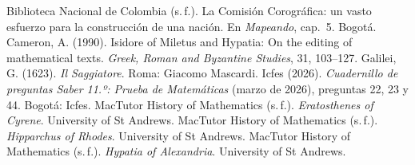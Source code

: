 \documentclass[11pt]{article}
\begin{document}
\begin{referencias}
 Biblioteca Nacional de Colombia (s.\,f.). La Comisión Corográfica: un
  vasto esfuerzo para la construcción de una nación. En \emph{Mapeando}, cap.~5. Bogotá.
 Cameron, A. (1990). Isidore of Miletus and Hypatia: On the
  editing of mathematical texts. \emph{Greek, Roman and Byzantine Studies}, 31, 103--127.
 Galilei, G. (1623). \emph{Il Saggiatore}. Roma: Giacomo Mascardi.
 Icfes (2026). \emph{Cuadernillo de preguntas Saber 11.º: Prueba
  de Matemáticas} (marzo de 2026), preguntas 22, 23 y 44. Bogotá: Icfes.
 MacTutor History of Mathematics (s.\,f.).
  \emph{Eratosthenes of Cyrene}. University of St Andrews.
 MacTutor History of Mathematics (s.\,f.).
  \emph{Hipparchus of Rhodes}. University of St Andrews.
 MacTutor History of Mathematics (s.\,f.).
  \emph{Hypatia of Alexandria}. University of St Andrews.

\end{referencias}
\end{document}
